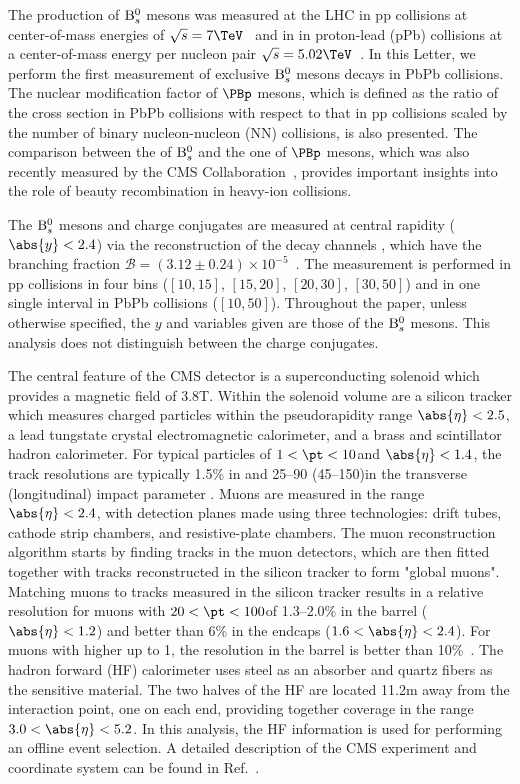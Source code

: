 The production of ${\mathrm{B}_{s}^{0}}$ mesons was measured at the LHC in pp collisions at center-of-mass energies of $\sqrts=7\TeV$~\cite{Chatrchyan:2011vh}
and in in proton-lead (pPb) collisions at a center-of-mass energy per nucleon pair $\sqrts=5.02\TeV$~\cite{Khachatryan:2015uja}.
In this Letter, we perform the first measurement of exclusive ${\mathrm{B}_{s}^{0}}$ mesons decays in PbPb collisions. The nuclear modification factor \RAA of $\PBp$ mesons, 
which is defined as the ratio of the cross section in PbPb collisions with respect to that in pp collisions scaled by the number of binary nucleon-nucleon (NN) collisions, 
is also presented. The comparison between the \RAA of ${\mathrm{B}_{s}^{0}}$ and the one of $\PBp$ mesons, which was also recently measured by the CMS Collaboration~\cite{PhysRevLett.119.152301}, provides
important insights into the role of beauty recombination in heavy-ion collisions. 


The ${\mathrm{B}_{s}^{0}}$ mesons and charge conjugates are measured at central rapidity ($\abs{y}<2.4$) via the reconstruction of the decay channels \Bzerosdecay, 
which have the branching fraction $\mathcal{B} = (3.12 \pm 0.24) \times 10^{-5}$~\cite{pdg:2016}.  The measurement is performed in pp collisions in four 
\pt bins ($[10,15]$, $[15,20]$, $[20,30]$, $[30,50]$\GeVc) and in one single \pt interval in PbPb collisions ($[10,50]$\GeVc). Throughout the paper, 
unless otherwise specified, the $y$ and \pt variables given are those of the ${\mathrm{B}_{s}^{0}}$ mesons. This analysis does not distinguish between the charge conjugates.


The central feature of the CMS detector is a superconducting solenoid which provides a magnetic field of 3.8\unit{T}. Within the solenoid volume are a silicon tracker which measures charged particles within the pseudorapidity range $\abs{\eta} < 2.5$, a lead tungstate crystal electromagnetic calorimeter, and a brass and scintillator hadron calorimeter. For typical particles of $1 < \pt < 10$\GeVc and $\abs{\eta} < 1.4$, the track resolutions are typically 1.5\% in \pt and 25--90 (45--150)\mum in the transverse (longitudinal) impact parameter \cite{TRK-11-001}. Muons are measured in the range $\abs{\eta} < 2.4$, with detection planes made using three technologies: drift tubes, cathode strip chambers, and resistive-plate chambers. The muon reconstruction algorithm starts by finding tracks in the muon detectors, which are then fitted together with tracks reconstructed in the silicon tracker to form "global muons". Matching muons to tracks measured in the silicon tracker results in a relative \pt resolution for muons with $20 < \pt < 100$\GeVc of 1.3--2.0\% in the barrel ($\abs{\eta} < 1.2$) and better than 6\% in the endcaps ($1.6 < \abs{\eta} < 2.4$).
For muons with higher \pt up to 1\TeVc, the \pt resolution in the barrel is better than 10\%~\cite{Chatrchyan:2012xi}.  The hadron forward (HF) calorimeter uses steel as an absorber and quartz fibers as the sensitive material. The two halves of the HF are located 11.2\unit{m} away from the interaction point, one on each end, providing together coverage in the range $3.0 < \abs{\eta} < 5.2$. In this analysis, the HF information is used for performing an offline event selection. A detailed description of the CMS experiment and coordinate system can be found in Ref.~\cite{bib_CMS}.

